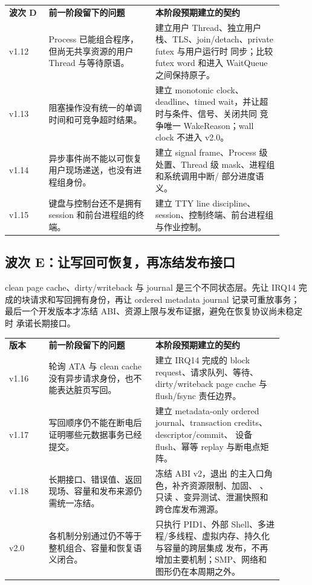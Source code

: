 \begin{longtable}{|L{0.13\linewidth}|L{0.35\linewidth}|L{0.42\linewidth}|}
\hline
{}
\textbf{波次 D} & \textbf{前一阶段留下的问题} & \textbf{本阶段预期建立的契约} \\\tablerowrule
\endhead
v1.12 & Process 已能组合程序，但尚无共享资源的用户 Thread 与等待原语。 &
建立用户 Thread、独立用户栈、TLS、join/detach、private futex 与用户运行时
同步；比较 futex word 和进入 WaitQueue 之间保持原子。 \\\tablerowrule
v1.13 & 阻塞操作没有统一的单调时间和可竞争超时结果。 &
建立 monotonic clock、deadline、timed wait，并让超时与条件、信号、关闭共同
竞争唯一 WakeReason；wall clock 不进入 v2.0。 \\\tablerowrule
v1.14 & 异步事件尚不能以可恢复用户现场递送，也没有进程组身份。 &
建立 signal frame、Process 级处置、Thread 级 mask、进程组和系统调用中断/
部分进度语义。 \\\tablerowrule
v1.15 & 键盘与控制台还不是拥有 session 和前台进程组的终端。 &
建立 TTY line discipline、session、控制终端、前台进程组与作业控制。 \\\hline
\end{longtable}

\subsection*{波次 E：让写回可恢复，再冻结发布接口}

clean page cache、dirty/writeback 与 journal 是三个不同状态层。先让 IRQ14
完成的块请求和写回拥有身份，再让 ordered metadata journal 记录可重放事务；
最后一个开发版本才冻结 ABI、资源上限与发布证据，避免在恢复协议尚未稳定时
承诺长期接口。

\begin{longtable}{|L{0.13\linewidth}|L{0.35\linewidth}|L{0.42\linewidth}|}
\hline
{}
\textbf{版本} & \textbf{前一阶段留下的问题} & \textbf{本阶段预期建立的契约} \\\tablerowrule
\endhead
v1.16 & 轮询 ATA 与 clean cache 没有异步请求身份，也不能表达脏页写回。 &
建立 IRQ14 完成的 block request、请求队列、等待、dirty/writeback page cache
与 flush/fsync 责任边界。 \\\tablerowrule
v1.17 & 写回顺序仍不能在断电后证明哪些元数据事务已经提交。 &
建立 metadata-only ordered journal、transaction credits、descriptor/commit、
设备 flush、幂等 replay 与断电点矩阵。 \\\tablerowrule
v1.18 & 长期接口、错误值、返回现场、容量和发布来源仍需统一冻结。 &
冻结 ABI v2，退出  的主入口角色，补齐资源限制、加固、
、只读 、变异测试、泄漏快照和跨仓库发布溯源。 \\\tablerowrule
v2.0 & 各机制分别通过仍不等于整机组合、容量和恢复语义闭合。 &
只执行 PID1、外部 Shell、多进程/多线程、虚拟内存、持久化与容量的跨层集成
发布，不再增加主要机制；SMP、网络和图形仍在本周期之外。 \\\hline
\end{longtable}

